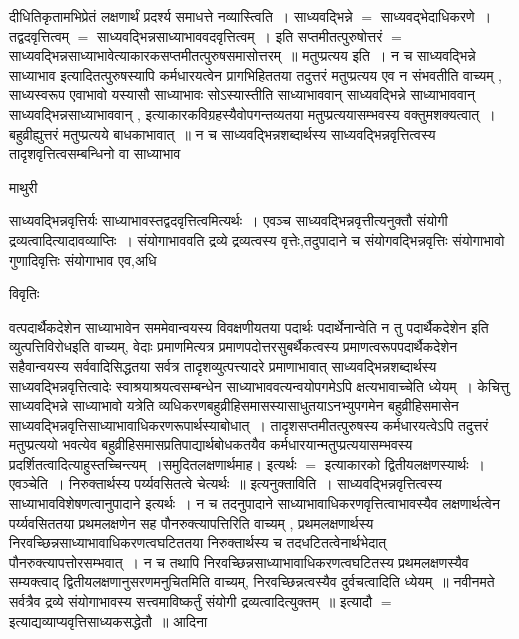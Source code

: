 \documentclass[10pt, openany]{book}
\begin{document}
{दीधितिकृतामभिप्रेतं लक्षणार्थं प्रदर्श्य समाधत्ते नव्यास्त्विति~। साध्यवद्भिन्ने $=$ साध्यवद्भेदाधिकरणे~। तद्वदवृत्तित्वम् $=$ साध्यवद्भिन्नसाध्याभाववदवृत्तित्वम्~। इति सप्तमीतत्पुरुषोत्तरं $=$ साध्यवद्भिन्नसाध्याभावेत्याकारकसप्तमीतत्पुरुषसमासोत्तरम्~॥ मतुप्प्रत्यय इति~। न च साध्यवद्भिन्ने साध्याभाव इत्यादितत्पुरुषस्यापि कर्मधारयत्वेन प्रागभिहिततया तदुत्तरं मतुप्प्रत्यय एव न संभवतीति वाच्यम् , साध्यस्वरूप एवाभावो यस्यासौ साध्याभावः सोऽस्यास्तीति साध्याभाववान् साध्यवद्भिन्ने साध्याभाववान् साध्यवद्भिन्नसाध्याभाववान् , इत्याकारकविग्रहस्यैवोपगन्तव्यतया मतुप्प्रत्ययासम्भवस्य वक्तुमशक्यत्वात्~। बहुव्रीह्युत्तरं मतुप्प्रत्यये बाधकाभावात्~॥ न च
साध्यवद्भिन्नशब्दार्थस्य साध्यवद्भिन्नवृत्तित्वस्य तादृशवृत्तित्वसम्बन्धिनो वा साध्याभाव
\newpage
 \begin{center}  माथुरी  \end{center}
{\la साध्यवद्भिन्नवृत्तिर्यः साध्याभावस्तद्वदवृत्तित्वमित्यर्थः~। एवञ्च साध्यवद्भिन्नवृत्तीत्यनुक्तौ संयोगी द्रव्यत्वादित्यादावव्याप्तिः~। संयोगाभाववति द्रव्ये द्रव्यत्वस्य वृत्तेः,तदुपादाने च संयोगवद्भिन्नवृत्तिः संयोगाभावो गुणादिवृत्तिः संयोगाभाव एव,अधि}
\begin{center}     विवृतिः \end{center}
वत्पदार्थैकदेशेन साध्याभावेन सममेवान्वयस्य विवक्षणीयतया {\qt पदार्थः पदार्थेनान्वेति न तु पदार्थैकदेशेन} इति व्युत्पत्तिविरोधइति वाच्यम्, वेदाः प्रमाणमित्यत्र प्रमाणपदोत्तरसुबर्थैकत्वस्य प्रमाणत्वरूपपदार्थैकदेशेन सहैवान्वयस्य सर्ववादिसिद्धतया सर्वत्र तादृशव्युत्पत्त्यादरे प्रमाणाभावात् साध्यवद्भिन्नशब्दार्थस्य साध्यवद्भिन्नवृत्तित्वादेः स्वाश्रयाश्रयत्वसम्बन्धेन साध्याभाववत्यन्वयोपगमेऽपि क्षत्यभावाच्चेति ध्येयम्~। {\la केचित्तु} साध्यवद्भिन्ने साध्याभावो यत्रेति
व्यधिकरणबहुव्रीहिसमासस्यासाधुतयाऽनभ्युपगमेन बहुव्रीहिसमासेन साध्यवद्भिन्नवृत्तिसाध्याभावाधिकरणरूपार्थस्याबोधात्~। तादृशसप्तमीतत्पुरुषस्य
कर्मधारयत्वेऽपि तदुत्तरं मतुप्प्रत्ययो भवत्येव बहुव्रीहिसमासप्रतिपाद्यार्थबोधकतयैव कर्मधारयान्मतुप्प्रत्ययासम्भवस्य प्रदर्शितत्वादित्याहुस्तच्चिन्त्यम्~।समुदितलक्षणार्थमाह। इत्यर्थः $=$ इत्याकारको द्वितीयलक्षणस्यार्थः~। {\qt एवञ्चेति~।} निरुक्तार्थस्य पर्य्यवसितत्वे चेत्यर्थः~॥ {\la इत्यनुक्ताविति~।} साध्यवद्भिन्नवृत्तित्वस्य साध्याभावविशेषणत्वानुपादाने इत्यर्थः~। न च तदनुपादाने साध्याभावाधिकरणवृत्तित्वाभावस्यैव लक्षणार्थत्वेन पर्य्यवसिततया प्रथमलक्षणेन सह पौनरुक्त्यापत्तिरिति वाच्यम् , प्रथमलक्षणार्थस्य निरवच्छिन्नसाध्याभावाधिकरणत्वघटिततया निरुक्तार्थस्य च तदधटितत्वेनार्थभेदात् पौनरुक्त्यापत्तोरसम्भवात्~। न च तथापि निरवच्छिन्नसाध्याभावाधिकरणत्वघटितस्य प्रथमलक्षणस्यैव सम्यक्त्वाद् द्वितीयलक्षणानुसरणमनुचितमिति वाच्यम्, निरवच्छिन्नत्वस्यैव दुर्वचत्वादिति ध्येयम्~॥ नवीनमते सर्वत्रैव द्रव्ये संयोगाभावस्य सत्त्वमाविष्कर्तुं संयोगी द्रव्यत्वादित्युक्तम्~॥ इत्यादौ $=$ इत्याद्यव्याप्यवृत्तिसाध्यकसद्धेतौ~॥ आदिना
}
\end{document}
